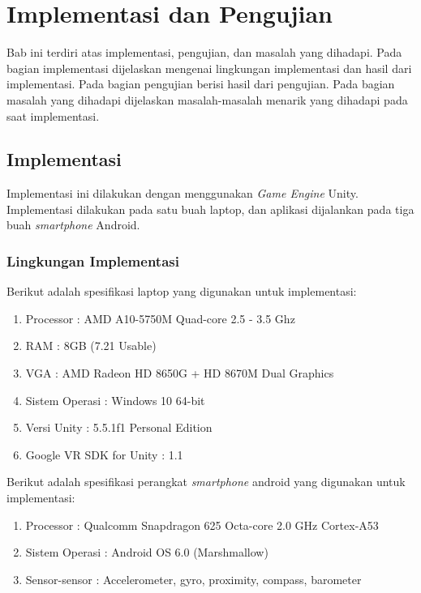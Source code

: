 \chapter{Implementasi dan Pengujian}
\label{chap:implementasi_dan_pengujian}

Bab ini terdiri atas implementasi, pengujian, dan masalah yang dihadapi. Pada bagian implementasi dijelaskan mengenai lingkungan implementasi dan hasil dari implementasi. Pada bagian pengujian berisi hasil dari pengujian. Pada bagian masalah yang dihadapi dijelaskan masalah-masalah menarik yang dihadapi pada saat implementasi. 

\section{Implementasi}
\label{sec:implementasi}

Implementasi ini dilakukan dengan menggunakan \textit{Game Engine} Unity. Implementasi dilakukan pada satu buah laptop, dan aplikasi dijalankan pada tiga buah \textit{smartphone} Android. 

\subsection{Lingkungan Implementasi}
\label{ssec:lingkungan_implementasi_dan_pengujian}

Berikut adalah spesifikasi laptop yang digunakan untuk implementasi:
\begin{enumerate}
    \item Processor : AMD A10-5750M Quad-core 2.5 - 3.5 Ghz
    \item RAM : 8GB (7.21 Usable)
    \item VGA : AMD Radeon HD 8650G + HD 8670M Dual Graphics
    \item Sistem Operasi : Windows 10 64-bit
    \item Versi Unity : 5.5.1f1 Personal Edition
    \item Google VR SDK for Unity : 1.1 
\end{enumerate}

Berikut adalah spesifikasi perangkat \textit{smartphone} android yang digunakan untuk implementasi:
\begin{enumerate}
    \item Processor : Qualcomm Snapdragon 625 Octa-core 2.0 GHz Cortex-A53
    \item Sistem Operasi : Android OS 6.0 (Marshmallow)
    \item Sensor-sensor : Accelerometer, gyro, proximity, compass, barometer
\end{enumerate}

